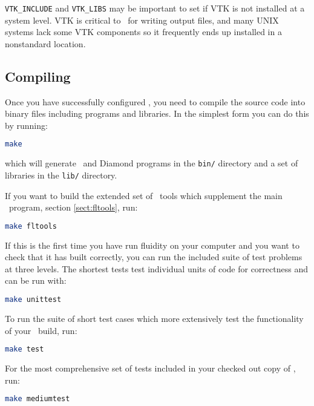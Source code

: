 \lstinline[language=Bash]+VTK_INCLUDE+ and \lstinline[language=Bash]+VTK_LIBS+
may be important to set if VTK is not installed at a system level. VTK is
critical to \fluidity\ for writing output files, and many UNIX systems lack some
VTK components so it frequently ends up installed in a nonstandard location.

\subsection{Compiling \fluidity}
\label{sect:compiling_fluidity}

Once you have successfully configured \fluidity, you need to compile the source
code into binary files including programs and libraries. In the simplest form
you can do this by running:

\begin{lstlisting}[language=Bash]
make
\end{lstlisting}

which will generate \fluidity\ and Diamond programs in the
\lstinline[language=Bash]+bin/+ directory and a set of libraries in the
\lstinline[language=Bash]+lib/+ directory. 

If you want to build the extended set of \fluidity\ tools which supplement the
main \fluidity\ program, section \ref{sect:fltools}, run:

\begin{lstlisting}[language=Bash]
make fltools
\end{lstlisting}

If this is the first time you have run fluidity on your computer and you want
to check that it has built correctly, you can run the included suite of test
problems at three levels. The shortest tests test individual units of code for
correctness and can be run with:

\begin{lstlisting}[language=Bash]
make unittest
\end{lstlisting}

To run the suite of short test cases which more extensively test the
functionality of your \fluidity\ build, run:

\begin{lstlisting}[language=Bash]
make test
\end{lstlisting}

For the most comprehensive set of tests included in your checked out copy of
\fluidity, run:

\begin{lstlisting}[language=Bash]
make mediumtest
\end{lstlisting}

